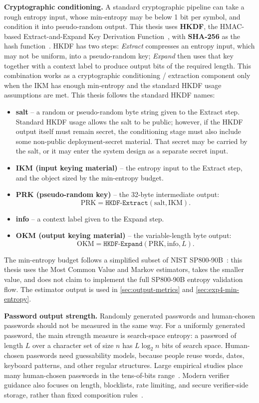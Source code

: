 \documentclass[11pt,titlepage,openany,oneside]{book}  %
\begin{document}
\textbf{Cryptographic conditioning.} A standard cryptographic pipeline can take a rough entropy input, whose min-entropy may be below 1 bit per symbol, and condition it into pseudo-random output. This thesis uses \textbf{HKDF}, the HMAC-based Extract-and-Expand Key Derivation Function~\citep{krawczyk2010rfc5869,krawczyk2010extraction}, with \textbf{SHA-256} as the hash function~\citep{nist2015fips180}. HKDF has two steps: \emph{Extract} compresses an entropy input, which may not be uniform, into a pseudo-random key; \emph{Expand} then uses that key together with a context label to produce output bits of the required length. This combination works as a cryptographic conditioning / extraction component only when the IKM has enough min-entropy and the standard HKDF usage assumptions are met. This thesis follows the standard HKDF names:

\begin{itemize}
\item \textbf{salt} -- a random or pseudo-random byte string given to the Extract step. Standard HKDF usage allows the salt to be public; however, if the HKDF output itself must remain secret, the conditioning stage must also include some non-public deployment-secret material. That secret may be carried by the salt, or it may enter the system design as a separate secret input.
\item \textbf{IKM (input keying material)} -- the entropy input to the Extract step, and the object sized by the min-entropy budget.
\item \textbf{PRK (pseudo-random key)} -- the 32-byte intermediate output:
\[
\text{PRK} = \mathtt{HKDF\text{-}Extract}(\text{salt}, \text{IKM}).
\]
\item \textbf{info} -- a context label given to the Expand step.
\item \textbf{OKM (output keying material)} -- the variable-length byte output:
\[
\text{OKM} = \mathtt{HKDF\text{-}Expand}(\text{PRK}, \text{info}, L).
\]
\end{itemize}

The min-entropy budget follows a simplified subset of NIST SP800-90B~\citep{turan2018sp80090b}: this thesis uses the Most Common Value and Markov estimators, takes the smaller value, and does not claim to implement the full SP800-90B entropy validation flow. The estimator output is used in \cref{sec:output-metrics} and \cref{sec:exp4-min-entropy}.

\textbf{Password output strength.} Randomly generated passwords and human-chosen passwords should not be measured in the same way. For a uniformly generated password, the main strength measure is search-space entropy: a password of length $L$ over a character set of size $n$ has $L \log_2 n$ bits of search space. Human-chosen passwords need guessability models, because people reuse words, dates, keyboard patterns, and other regular structures. Large empirical studies place many human-chosen passwords in the tens-of-bits range~\citep{bonneau2012guessing,florencio2007webpassword}. Modern verifier guidance also focuses on length, blocklists, rate limiting, and secure verifier-side storage, rather than fixed composition rules~\citep{nist2025sp80063b}. 
\end{document}
